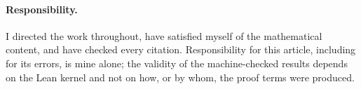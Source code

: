 \paragraph{Responsibility.} I directed the work throughout, have satisfied myself of the
mathematical content, and have checked every citation. Responsibility for this article,
including for its errors, is mine alone; the validity of the machine-checked results depends
on the Lean kernel and not on how, or by whom, the proof terms were produced.
